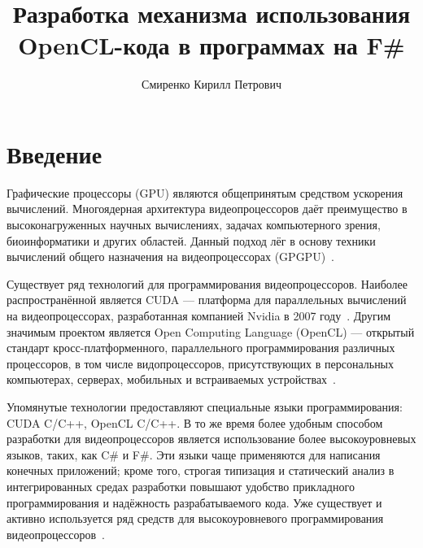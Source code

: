 \title{Разработка механизма использования OpenCL-кода в программах на F\#}


\author{Смиренко Кирилл Петрович}



\maketitle

\section*{Введение}
Графические процессоры (GPU) являются общепринятым средством ускорения вычислений. Многоядерная архитектура видеопроцессоров даёт преимущество в высоконагруженных научных вычислениях, задачах компьютерного зрения, биоинформатики и других областей. Данный подход лёг в основу техники вычислений общего назначения на видеопроцессорах (GPGPU)~\cite{CUDA_to_OpenCL, GPGPU_1}.

Существует ряд технологий для программирования видеопроцессоров. Наиболее распространённой является CUDA --- платформа для параллельных вычислений на видеопроцессорах, разработанная компанией Nvidia в 2007 году~\cite{CUDA}. Другим значимым проектом является Open Computing Language (OpenCL) --- открытый стандарт кросс-платформенного, параллельного программирования различных процессоров, в том числе видопроцессоров, присутствующих в персональных компьютерах, серверах, мобильных и встраиваемых устройствах~\cite{OpenCL}.

Упомянутые технологии предоставляют специальные языки программирования: CUDA C/C++, OpenCL C/C++. В то же время более удобным способом разработки для видеопроцессоров является использование более высокоуровневых языков, таких, как C\# и F\#. Эти языки чаще применяются для написания конечных приложений; кроме того, строгая типизация и статический анализ в интегрированных средах разработки повышают удобство прикладного программирования и надёжность разрабатываемого кода. Уже существует и активно используется ряд средств для высокоуровневого программирования видеопроцессоров~\cite{Brahma_FSharp, FSCL, AleaGPU}.

